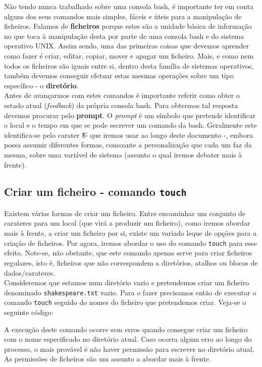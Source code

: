 \documentclass[a4paper, onecolumn, 10pt]{report}
\begin{document}
Não tendo nunca trabalhado sobre uma consola bash, é importante ter em conta alguns dos seus comandos mais simples, fáceis e úteis para a manipulação de ficheiros. Falamos de \textbf{ficheiros} porque estes são a unidade básica de informação no que toca à manipulação desta por parte de uma consola bash e do sistema operativo UNIX. Assim sendo, uma das primeiras coisas que devemos aprender como fazer é criar, editar, copiar, mover e apagar um ficheiro. Mais, e como nem todos os ficheiros são iguais entre si, dentro desta família de sistemas operativos, também devemos conseguir efetuar estas mesmas operações sobre um tipo específico - o \textbf{diretório}. \\
Antes de avançarmos com estes comandos é importante referir como obter o estado atual (\textit{feedback}) da própria consola bash. Para obtermos tal resposta devemos procurar pelo \textbf{prompt}. O \textit{prompt} é um símbolo que pretende identificar o local e o tempo em que se pode escrever um comando da bash. Geralmente este identifica-se pelo carater \'\$\' - que iremos usar ao longo deste documento -, embora possa assumir diferentes formas, consoante a personalização que cada um faz da mesma, sobre uma variável de sistema (assunto o qual iremos debater mais à frente). 

\subsection{Criar um ficheiro - comando \texttt{touch}}

Existem várias formas de criar um ficheiro. Entre encaminhar um conjunto de carateres para um local (que virá a produzir um ficheiro), como iremos abordar mais à frente, a criar um ficheiro por si, existe um variado leque de opções para a criação de ficheiros. Por agora, iremos abordar o uso do comando \texttt{touch} para esse efeito. Note-se, não obstante, que este comando apenas serve para criar ficheiros regulares, isto é, ficheiros que não correspondem a diretórios, atalhos ou blocos de dados/carateres. \\
Consideremos que estamos num diretório vazio e pretendemos criar um ficheiro denominado \texttt{shakes\-peare.txt} vazio. Para o fazer precisamos então de executar o comando \texttt{touch} seguido do nomes do ficheiro que pretendemos criar. Veja-se o seguinte código:



A execução deste comando ocorre sem erros quando consegue criar um ficheiro com o nome especificado no diretório atual. Caso ocorra algum erro ao longo do processo, o mais provável é não haver permissão para escrever no diretório atual. As permissões de ficheiros são um assunto a abordar mais à frente.
\end{document}

